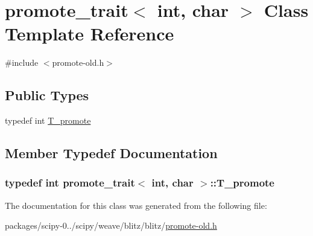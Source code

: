 \hypertarget{classpromote__trait_3_01int_00_01char_01_4}{}\section{promote\+\_\+trait$<$ int, char $>$ Class Template Reference}
\label{classpromote__trait_3_01int_00_01char_01_4}


{\ttfamily \#include $<$promote-\/old.\+h$>$}

\subsection*{Public Types}
\begin{DoxyCompactItemize}
\item 
typedef int \hyperlink{classpromote__trait_3_01int_00_01char_01_4_a0ebc39ab62472a3fd228d99032aace78}{T\+\_\+promote}
\end{DoxyCompactItemize}


\subsection{Member Typedef Documentation}
\hypertarget{classpromote__trait_3_01int_00_01char_01_4_a0ebc39ab62472a3fd228d99032aace78}{}
\subsubsection[{T\+\_\+promote}]{\setlength{\rightskip}{0pt plus 5cm}typedef int {\bf promote\+\_\+trait}$<$ int, char $>$\+::{\bf T\+\_\+promote}}\label{classpromote__trait_3_01int_00_01char_01_4_a0ebc39ab62472a3fd228d99032aace78}


The documentation for this class was generated from the following file\+:\begin{DoxyCompactItemize}
\item 
packages/scipy-\/0../scipy/weave/blitz/blitz/\hyperlink{promote-old_8h}{promote-\/old.\+h}\end{DoxyCompactItemize}
